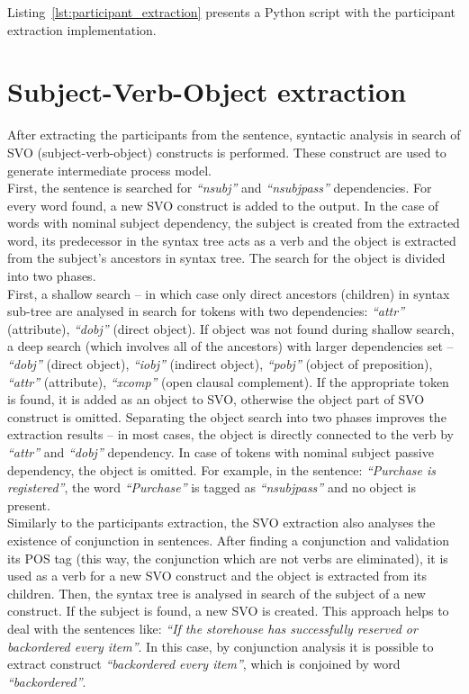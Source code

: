 Listing~\ref{lst:participant_extraction} presents a Python script with the participant extraction implementation.\\


\section{Subject-Verb-Object extraction}
\label{sec:svo}
After extracting the participants from the sentence, syntactic analysis in search of SVO (subject-verb-object) constructs is performed. These construct are used to generate intermediate process model.\\
First, the sentence is searched for \emph{``nsubj''} and \emph{``nsubjpass''} dependencies. For every word found, a new SVO construct is added to the output. In the case of words with nominal subject dependency, the subject is created from the extracted word, its predecessor in the syntax tree acts as a verb and the object is extracted from the subject's ancestors in syntax tree. The search for the object is divided into two phases.\\
First, a shallow search -- in which case only direct ancestors (children) in syntax sub-tree are analysed in search for tokens with two dependencies: \emph{``attr''} (attribute), \emph{``dobj''} (direct object). If object was not found during shallow search, a deep search (which involves all of the ancestors) with larger dependencies set -- \emph{``dobj''} (direct object), \emph{``iobj''} (indirect object), \emph{``pobj''} (object of preposition), \emph{``attr''} (attribute), \emph{``xcomp''} (open clausal complement). If the appropriate token is found, it is added as an object to SVO, otherwise the object part of SVO construct is omitted. Separating the object search into two phases improves the extraction results -- in most cases, the object is directly connected to the verb by \emph{``attr''} and \emph{``dobj''} dependency.  In case of tokens with nominal subject passive dependency, the object is omitted. For example, in the  sentence: \emph{``Purchase is registered''}, the word \emph{``Purchase''} is tagged as \emph{``nsubjpass''} and no object is present.\\
Similarly to the participants extraction, the SVO extraction also analyses the existence of conjunction in sentences. After finding a conjunction and validation its POS tag (this way, the conjunction which are not verbs are eliminated), it is used as a verb for a new SVO construct and the object is extracted from its children. Then, the syntax tree is analysed in search of the subject of a new construct. If the subject is found, a new SVO is created. This approach helps to deal with the sentences like: \emph{``If the storehouse has successfully reserved or backordered every item''}. In this case, by conjunction analysis it is possible to extract construct \emph{``backordered every item''}, which is conjoined by word \emph{``backordered''}.\\
